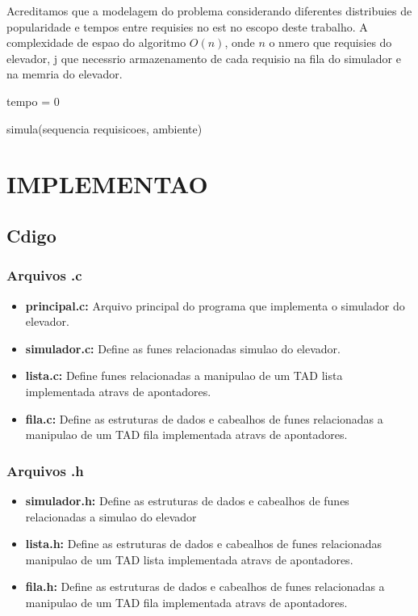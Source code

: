 \documentclass[12pt]{article}
\begin{document}
Acreditamos que a modelagem do problema considerando diferentes distribuies de popularidade e tempos entre requisies no est no escopo deste trabalho. A complexidade de espao do algoritmo  $O(n)$, onde $n$  o nmero que requisies do elevador, j que  necessrio  armazenamento de cada requisio na fila do simulador e na memria do elevador.
\begin{algorithm}[h!]
\begin{footnotesize}

	tempo = 0\;

\caption{simula(sequencia requisicoes, ambiente)}%
\end{footnotesize}
\end{algorithm}

\section{IMPLEMENTAO}
\label{implementacao}

\subsection{Cdigo}

\subsubsection{Arquivos .c}

\begin{itemize}
\item \textbf{principal.c:} Arquivo principal do programa que implementa o simulador do elevador.
\item \textbf{simulador.c:} Define as funes relacionadas  simulao do elevador.
\item \textbf{lista.c:} Define funes relacionadas a manipulao de um TAD lista implementada atravs de apontadores.
\item \textbf{fila.c:}  Define as estruturas de dados e cabealhos de funes relacionadas a manipulao de um TAD fila implementada atravs de apontadores.
\end{itemize}

\subsubsection{Arquivos .h}

\begin{itemize}
\item \textbf{simulador.h:}  Define as estruturas de dados e cabealhos de funes relacionadas a simulao do elevador
\item \textbf{lista.h:} Define as estruturas de dados e cabealhos de funes relacionadas  manipulao de um TAD lista implementada atravs de apontadores.
\item \textbf{fila.h:} Define as estruturas de dados e cabealhos de funes relacionadas a manipulao de um TAD fila implementada atravs de apontadores.

\end{itemize}
\end{document}
